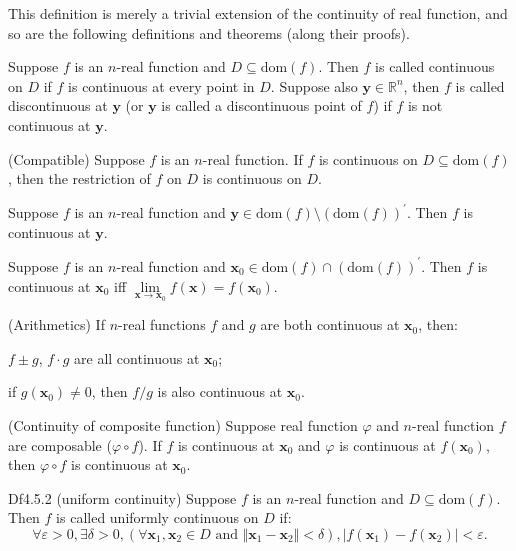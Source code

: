 \documentclass{article}
\begin{document}
\begin{Rmk}{}
    This definition is merely a trivial extension of the continuity of real function, and so are the following definitions and theorems (along their proofs).
    \begin{compactenum}
        \item \textcolor{Df}{Suppose $f$ is an $n$-real function and $D\subseteq\text{dom}(f)$. Then $f$ is called continuous on $D$ if $f$ is continuous at every point in $D$. Suppose also $\pmb{y}\in\mathbb{R}^n$, then $f$ is called discontinuous at $\pmb{y}$ (or $\pmb{y}$ is called a discontinuous point of $f$) if $f$ is not continuous at $\pmb{y}$.}
        \item \textcolor{Th}{(Compatible) Suppose $f$ is an $n$-real function. If $f$ is continuous on $D\subseteq\text{dom}(f)$, then the restriction of $f$ on $D$ is continuous on $D$.}
        \item \textcolor{Th}{Suppose $f$ is an $n$-real function and $\pmb{y}\in \text{dom}(f)\setminus(\text{dom}(f))^\prime$. Then $f$ is continuous at $\pmb{y}$.}
        \item \textcolor{Th}{Suppose $f$ is an $n$-real function and $\pmb{x}_0\in\text{dom}(f)\cap (\text{dom}(f))^\prime$. Then $f$ is continuous at $\pmb{x}_0$ iff $\lim\limits_{\pmb{x}\to\pmb{x}_0} f(\pmb{x}) = f(\pmb{x}_0)$.}
        \item \textcolor{Th}{(Arithmetics) If $n$-real functions $f$ and $g$ are both continuous at $\pmb{x}_0$, then: 
        \begin{compactenum}
            \item $f\pm g$, $f\cdot g$ are all continuous at $\pmb{x}_0$;
            \item if $g(\pmb{x}_0)\neq 0$, then $f/g$ is also continuous at $\pmb{x}_0$. 
        \end{compactenum}}
        \item \textcolor{Th}{(Continuity of composite function) Suppose real function $\varphi$ and $n$-real function $f$ are composable ($\varphi\circ f$). If $f$ is continuous at $\pmb{x}_0$ and $\varphi$ is continuous at $f(\pmb{x}_0)$, then $\varphi\circ f$ is continuous at $\pmb{x}_0$.}
    \end{compactenum}
\end{Rmk}

\begin{Df}{Df4.5.2 (uniform continuity)}
    Suppose $f$ is an $n$-real function and $D\subseteq\text{dom}(f)$. Then $f$ is called uniformly continuous on $D$ if:
    $$\forall\varepsilon>0, \exists\delta>0, \left(\forall \pmb{x}_1, \pmb{x}_2\in D\text{ and } \Vert\pmb{x}_1-\pmb{x}_2\Vert <\delta\right), |f(\pmb{x}_1)-f(\pmb{x}_2)|<\varepsilon.$$
\end{Df}
\end{document}
